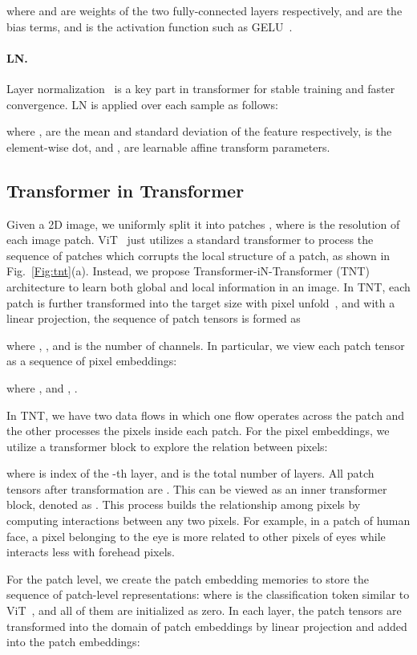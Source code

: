 \documentclass{article}
\begin{document}
where  and  are weights of the two fully-connected layers respectively,  and  are the bias terms, and  is the activation function such as GELU~\cite{gelu}.

\paragraph{LN.}
Layer normalization~\cite{ba2016layer} is a key part in transformer for stable training and faster convergence. LN is applied over each sample  as follows:

where ,  are the mean and standard deviation of the feature respectively,  is the element-wise dot, and ,  are learnable affine transform parameters.

\subsection{Transformer in Transformer}
Given a 2D image, we uniformly split it into  patches , where  is the resolution of each image patch. ViT~\cite{vit} just utilizes a standard transformer to process the sequence of patches which corrupts the local structure of a patch, as shown in Fig.~\ref{Fig:tnt}(a). Instead, we propose Transformer-iN-Transformer (TNT) architecture to learn both global and local information in an image. In TNT, each patch is further transformed into the target size  with pixel unfold~\cite{pytorch}, and with a linear projection, the sequence of patch tensors is formed as

where , , and  is the number of channels. In particular, we view each patch tensor  as a sequence of pixel embeddings:

where , and , .

In TNT, we have two data flows in which one flow operates across the patch and the other processes the pixels inside each patch. For the pixel embeddings, we utilize a transformer block to explore the relation between pixels:

where  is index of the -th layer, and  is the total number of layers. All patch tensors after transformation are . This can be viewed as an inner transformer block, denoted as .  This process builds the relationship among pixels by computing interactions between any two pixels. For example, in a patch of human face, a pixel belonging to the eye is more related to other pixels of eyes while interacts less with forehead pixels.

For the patch level, we create the patch embedding memories to store the sequence of patch-level representations:  where  is the classification token similar to ViT~\cite{vit}, and all of them are initialized as zero. In each layer, the patch tensors are transformed into the domain of patch embeddings by linear projection and added into the patch embeddings:
\end{document}
